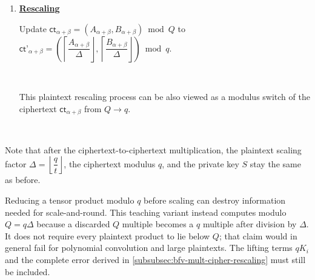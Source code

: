 \begin{tcolorbox}[title={\textbf{\tboxlabel{\ref*{subsubsec:bfv-mult-cipher-summary}} BFV's Ciphertext-to-Ciphertext Multiplication}}]
\begin{enumerate}
$ \textsf{ct}_\alpha = (D
_1, D_0)$

$ \textsf{ct}_\beta = \bm{\langle} \textsf{Decomp}^{\beta, l}(D_2), \text{ } \textsf{RLev}_{S, \sigma}^{\beta, l}( S^2) \bm{\rangle}$.

$ \textsf{ct}_{\alpha + \beta} = \textsf{ct}_{\alpha} + \textsf{ct}_{\beta}$

$ $

Then, the following property holds: 

$\phi_S(\textsf{ct}_{\alpha+\beta})\equiv(\Delta M^{\langle1\rangle}+E^{\langle1\rangle}+qK_1)(\Delta M^{\langle2\rangle}+E^{\langle2\rangle}+qK_2)+E_{\rm rl}\pmod Q$.

$ $




\item \textbf{\underline{Rescaling}}

Update $\textsf{ct}_{\alpha + \beta} = (A_{\alpha + \beta}, B_{\alpha + \beta}) \bmod Q$ to $\textsf{ct'}_{\alpha + \beta} = \left(\left\lceil\dfrac{A_{\alpha + \beta}}{\Delta}\right\rfloor, \left\lceil\dfrac{B_{\alpha + \beta}}{\Delta}\right\rfloor\right) \bmod q$. 

$ $

This plaintext rescaling process can be also viewed as a modulus switch of the ciphertext $\textsf{ct}_{\alpha + \beta}$ from $Q \rightarrow q$. 


$ $

\end{enumerate}

Note that after the ciphertext-to-ciphertext multiplication, the plaintext scaling factor $\Delta=\left\lfloor\dfrac{q}{t}\right\rfloor$, the ciphertext modulus $q$, and the private key $S$ stay the same as before.



\end{tcolorbox}


 Reducing a tensor product modulo $q$ before scaling can destroy information needed for scale-and-round. This teaching variant instead computes modulo $Q=q\Delta$ because a discarded $Q$ multiple becomes a $q$ multiple after division by $\Delta$. It does not require every plaintext product to lie below $Q$; that claim would in general fail for polynomial convolution and large plaintexts. The lifting terms $qK_i$ and the complete error derived in \autoref{subsubsec:bfv-mult-cipher-rescaling} must still be included.

$ $

